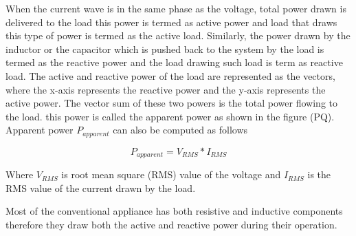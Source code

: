 When the current wave is in the same phase as the voltage, total power drawn is delivered to the load this power is termed as active power and load that draws this type of power is termed as the active load. Similarly, the power drawn by the inductor or the capacitor which is pushed back to the system by the load is termed as the reactive power and the load drawing such load is term as reactive load. The active and reactive power of the load are represented as the vectors, where the x-axis represents the reactive power and the y-axis represents the active power. The vector sum of these two powers is the total power flowing to the load. this power is called the apparent power as shown in the figure (PQ). Apparent power $P_{apparent}$ can also be computed as follows 

$$P_{apparent} = V_{RMS} * I_{RMS} $$

Where $V_{RMS}$ is root mean square (RMS) value of the voltage and $I_{RMS}$ is the RMS value of the current drawn by the load.

Most of the conventional appliance has both resistive and inductive components therefore they draw both the active and reactive power during their operation. 